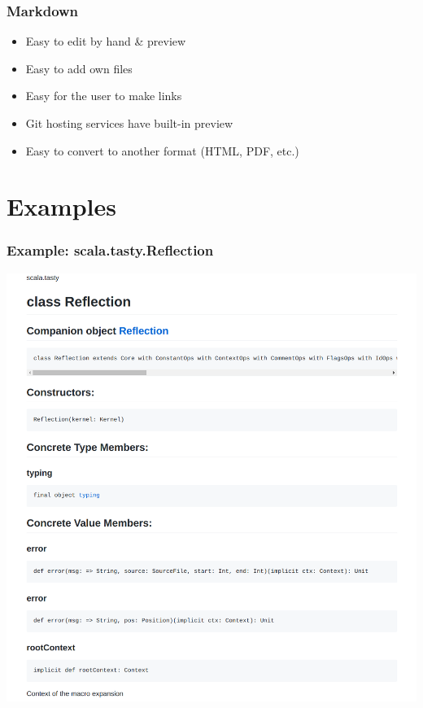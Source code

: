 \documentclass{beamer}
\begin{document}
\begin{frame}
  \frametitle{Markdown}
  \begin{itemize}
    \item Easy to edit by hand \& preview 
    \item Easy to add own files 
    \item Easy for the user to make links 
    \item Git hosting services have built-in preview 
    \item Easy to convert to another format (HTML, PDF, etc.)
  \end{itemize}
\end{frame}

\section{Examples}

\begin{frame}
  \frametitle{Example: scala.tasty.Reflection}
  \begin{center}
    \includegraphics[width=\textwidth,height=0.9\textheight,keepaspectratio]{images/reflection.png}
  \end{center}
\end{frame}
\end{document}
